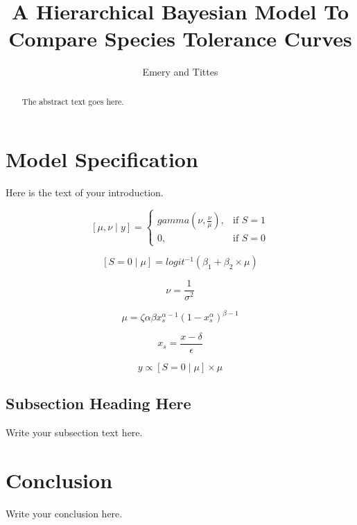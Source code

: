 \documentclass{article}
\begin{document}
\title{A Hierarchical Bayesian Model To Compare Species Tolerance Curves}
\author{Emery and Tittes}

\maketitle

\begin{abstract}
The abstract text goes here.
\end{abstract}

\section{Model Specification}
Here is the text of your introduction.

\[
  [\mu, \nu \mid y] =
  \begin{cases}
    gamma( \nu, \frac{\nu}{\mu}), & \text{if } S = 1 \\
    0, & \text{if } S = 0
  \end{cases}
\]


$$[S = 0 \mid \mu ]  = logit^{-1}(\beta_1 + \beta_2 \times \mu)$$

$$\nu =  \frac{1}{\sigma^2}$$


$$\mu = {\zeta}{\alpha}{\beta}x_s^{ \alpha - 1 }{(1-x_s^{ \alpha })}^{ \beta - 1}$$

$$x_s = \frac{x - \delta}{\epsilon}$$


$$ y  \propto [S = 0 \mid \mu] \times \mu $$









\subsection{Subsection Heading Here}
Write your subsection text here.



\section{Conclusion}
Write your conclusion here.
\end{document}
